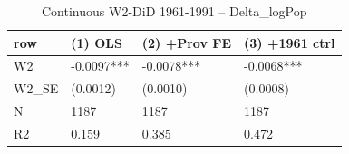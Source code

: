 \begin{table}

\caption{Continuous W2-DiD 1961-1991 -- Delta_logPop}
\centering
\begin{tabular}[t]{llll}
\toprule
row & (1) OLS & (2) +Prov FE & (3) +1961 ctrl\\
\midrule
W2 & -0.0097*** & -0.0078*** & -0.0068***\\
W2\_SE & (0.0012) & (0.0010) & (0.0008)\\
N & 1187 & 1187 & 1187\\
R2 & 0.159 & 0.385 & 0.472\\
\bottomrule
\end{tabular}
\end{table}
